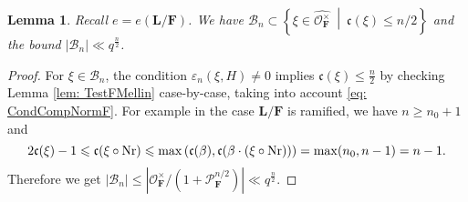 \documentclass[A4]{amsart}
\def\leq{\leqslant}
\def\geq{\geqslant}
\newtheorem{lemma}      [theorem]{Lemma}
\numberwithin{equation}{section} \everymath{\displaystyle}
\newcommand{\Nr}{{\rm Nr}}
\newcommand{\F}{\mathbf{F}}
\newcommand{\bL}{\mathbf{L}}
\newcommand{\vO}{\mathcal{O}}
\newcommand{\vP}{\mathcal{P}}
\newcommand{\extnorm}[1]{\left\lvert #1 \right\rvert}
\newcommand{\cond}{\mathfrak{c}}
\begin{document}
\begin{lemma} \label{lem: BnAnal}
	Recall $e=e(\bL/\F)$. We have $\mathcal{B}_n \subset \left\{ \xi \in \widehat{\vO_{\F}^{\times}} \ \middle| \ \cond(\xi) \leq n/2 \right\}$ and the bound $\extnorm{\mathcal{B}_n} \ll q^{\frac{n}{2}}$.
\end{lemma}
\begin{proof}
	For $\xi \in \mathcal{B}_n$, the condition $\varepsilon_n(\xi,H) \neq 0$ implies $\cond(\xi) \leq \tfrac{n}{2}$ by checking Lemma \ref{lem: TestFMellin} case-by-case, taking into account \eqref{eq: CondCompNormF}. For example in the case $\bL/\F$ is ramified, we have $n \geq n_0+1$ and
	$$ 2\cond(\xi)-1 \leq \cond(\xi \circ \Nr) \leq \max \left( \cond(\beta), \cond(\beta \cdot (\xi \circ \Nr)) \right) = \max(n_0, n-1) = n-1. $$
	Therefore we get $\extnorm{\mathcal{B}_n} \leq \extnorm{\vO_{\F}^{\times}/(1+\vP_{\F}^{n/2})} \ll q^{\frac{n}{2}}$.
\end{proof}
\end{document}
